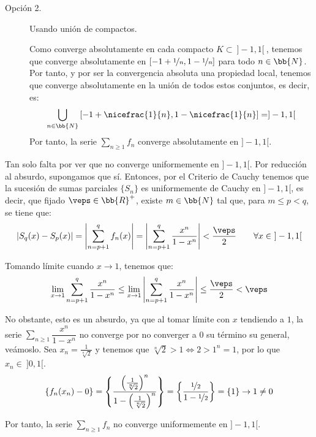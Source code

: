 \begin{ejercicio}
\begin{description}
        \item[Opción 2.] Usando unión de compactos.
        
        Como converge absolutamente en cada compacto $K\subset~]-1,1[~$, tenemos que converge absolutamente en $\left[-1+\nicefrac{1}{n}, 1-\nicefrac{1}{n}\right]$ para todo $n\in \bb{N}$.
        Por tanto, y por ser la convergencia absoluta una propiedad local, tenemos que converge absolutamente en la unión de todos estos conjuntos, es decir, es:
        \begin{equation*}
            \bigcup_{n\in \bb{N}}\left[-1+\nicefrac{1}{n}, 1-\nicefrac{1}{n}\right] = ]-1,1[
        \end{equation*}
        Por tanto, la serie $\sum\limits_{n\geq 1}f_n$ converge absolutamente en $]-1,1[$.
    \end{description}

    Tan solo falta por ver que no converge uniformemente en $]-1,1[$. Por reducción al absurdo, supongamos que sí.
    Entonces, por el Criterio de Cauchy tenemos que la sucesión de sumas parciales $\{S_n\}$ es uniformemente de Cauchy en $]-1,1[$, es decir, que fijado
    $\veps\in \bb{R}^+$, existe $m\in \bb{N}$ tal que, para $m\leq p < q$, se tiene que:
    \begin{equation*}
        |S_q(x) - S_p(x)| = \left|\sum_{n=p+1}^q f_n(x)\right|
        = \left|\sum_{n=p+1}^q \frac{x^n}{1-x^n}\right| < \frac{\veps}{2} \qquad \forall x\in~]-1,1[
    \end{equation*}
    
    Tomando límite cuando $x\to 1$, tenemos que:
    \begin{equation*}
        \lim_{x\to 1}\sum_{n=p+1}^q \frac{x^n}{1-x^n} \leq \lim_{x\to 1}\left|\sum_{n=p+1}^q \frac{x^n}{1-x^n}\right| \leq \frac{\veps}{2} < \veps
    \end{equation*}

    No obstante, esto es un absurdo, ya que al tomar límite con $x$ tendiendo a $1$, la serie $\sum\limits_{n\geq 1}\dfrac{x^n}{1-x^n}$ no converge por no converger a 0 su término su general, veámoslo.
    Sea $x_n=\frac{1}{\sqrt[n]{2}}$ y tenemos que $\sqrt[n]{2}>1 \Longleftrightarrow 2>1^n=1$, por lo que $x_n\in~]0,1[$.
    \begin{equation*}
        \left\{f_n(x_n)-0\right\} = \left\{\frac{\left(\frac{1}{\sqrt[n]{2}}\right)^n}{1-\left(\frac{1}{\sqrt[n]{2}}\right)^n}\right\} = \left\{\frac{\nicefrac{1}{2}}{1-\nicefrac{1}{2}}\right\} = \left\{1\right\}\to 1\neq 0
    \end{equation*}
    
    Por tanto, la serie $\sum\limits_{n\geq 1}f_n$ no converge uniformemente en $]-1,1[$.
\end{ejercicio}


